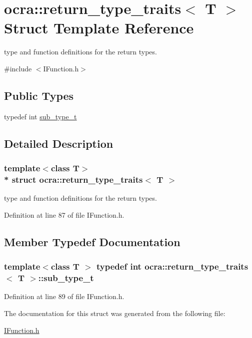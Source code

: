 \hypertarget{structocra_1_1return__type__traits}{}\section{ocra\+:\+:return\+\_\+type\+\_\+traits$<$ T $>$ Struct Template Reference}
\label{structocra_1_1return__type__traits}


type and function definitions for the return types.  




{\ttfamily \#include $<$I\+Function.\+h$>$}

\subsection*{Public Types}
\begin{DoxyCompactItemize}
\item 
typedef int \hyperlink{structocra_1_1return__type__traits_a28ffd04e2ff6d8e8a186c1aeaa89d881}{sub\+\_\+type\+\_\+t}
\end{DoxyCompactItemize}


\subsection{Detailed Description}
\subsubsection*{template$<$class T$>$\\*
struct ocra\+::return\+\_\+type\+\_\+traits$<$ T $>$}

type and function definitions for the return types. 

Definition at line 87 of file I\+Function.\+h.



\subsection{Member Typedef Documentation}
\subsubsection[{\texorpdfstring{sub\+\_\+type\+\_\+t}{sub_type_t}}]{\setlength{\rightskip}{0pt plus 5cm}template$<$class T $>$ typedef int {\bf ocra\+::return\+\_\+type\+\_\+traits}$<$ T $>$\+::{\bf sub\+\_\+type\+\_\+t}}\hypertarget{structocra_1_1return__type__traits_a28ffd04e2ff6d8e8a186c1aeaa89d881}{}\label{structocra_1_1return__type__traits_a28ffd04e2ff6d8e8a186c1aeaa89d881}


Definition at line 89 of file I\+Function.\+h.



The documentation for this struct was generated from the following file\+:\begin{DoxyCompactItemize}
\item 
\hyperlink{IFunction_8h}{I\+Function.\+h}\end{DoxyCompactItemize}
